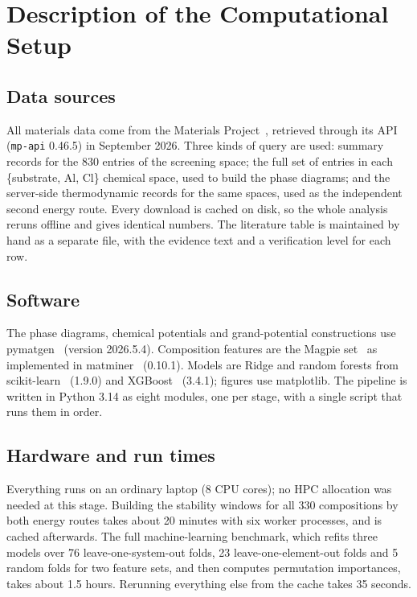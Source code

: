 \section{Description of the Computational Setup}
\label{sec:setup}

\subsection{Data sources}
All materials data come from the Materials Project~\citep{Jain2013}, retrieved through its API (\texttt{mp-api} 0.46.5) in September 2026. Three kinds of query are used: summary records for the 830 entries of the screening space; the full set of entries in each \{substrate, Al, Cl\} chemical space, used to build the phase diagrams; and the server-side thermodynamic records for the same spaces, used as the independent second energy route. Every download is cached on disk, so the whole analysis reruns offline and gives identical numbers. The literature table is maintained by hand as a separate file, with the evidence text and a verification level for each row.

\subsection{Software}
The phase diagrams, chemical potentials and grand-potential constructions use pymatgen~\citep{Ong2013} (version 2026.5.4). Composition features are the Magpie set~\citep{Ward2016} as implemented in matminer~\citep{Ward2018} (0.10.1). Models are Ridge and random forests from scikit-learn~\citep{Pedregosa2011} (1.9.0) and XGBoost~\citep{Chen2016} (3.4.1); figures use matplotlib. The pipeline is written in Python 3.14 as eight modules, one per stage, with a single script that runs them in order.

\subsection{Hardware and run times}
Everything runs on an ordinary laptop (8 CPU cores); no HPC allocation was needed at this stage. Building the stability windows for all 330 compositions by both energy routes takes about 20 minutes with six worker processes, and is cached afterwards. The full machine-learning benchmark, which refits three models over 76 leave-one-system-out folds, 23 leave-one-element-out folds and 5 random folds for two feature sets, and then computes permutation importances, takes about 1.5 hours. Rerunning everything else from the cache takes 35 seconds.


